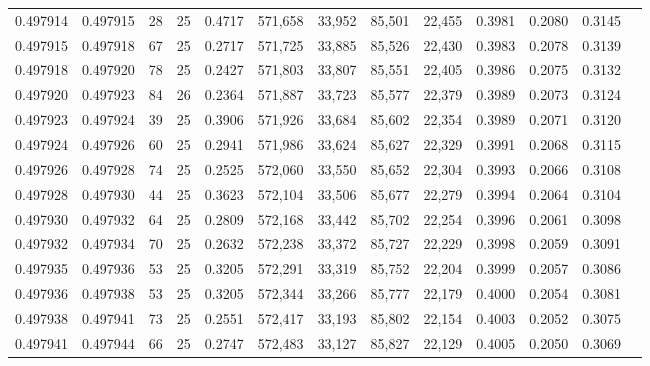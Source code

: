 \begin{tabular}{rrrrrrrrrrrrr}
0.497914 & 0.497915 &    28 &  25 &                                     0.4717 & 571,658 &  33,952 &  85,501 &  22,455 & 0.3981 & 0.2080 & 0.3145 \\
0.497915 & 0.497918 &    67 &  25 &                                     0.2717 & 571,725 &  33,885 &  85,526 &  22,430 & 0.3983 & 0.2078 & 0.3139 \\
0.497918 & 0.497920 &    78 &  25 &                                     0.2427 & 571,803 &  33,807 &  85,551 &  22,405 & 0.3986 & 0.2075 & 0.3132 \\
0.497920 & 0.497923 &    84 &  26 &                                     0.2364 & 571,887 &  33,723 &  85,577 &  22,379 & 0.3989 & 0.2073 & 0.3124 \\
0.497923 & 0.497924 &    39 &  25 &                                     0.3906 & 571,926 &  33,684 &  85,602 &  22,354 & 0.3989 & 0.2071 & 0.3120 \\
0.497924 & 0.497926 &    60 &  25 &                                     0.2941 & 571,986 &  33,624 &  85,627 &  22,329 & 0.3991 & 0.2068 & 0.3115 \\
0.497926 & 0.497928 &    74 &  25 &                                     0.2525 & 572,060 &  33,550 &  85,652 &  22,304 & 0.3993 & 0.2066 & 0.3108 \\
0.497928 & 0.497930 &    44 &  25 &                                     0.3623 & 572,104 &  33,506 &  85,677 &  22,279 & 0.3994 & 0.2064 & 0.3104 \\
0.497930 & 0.497932 &    64 &  25 &                                     0.2809 & 572,168 &  33,442 &  85,702 &  22,254 & 0.3996 & 0.2061 & 0.3098 \\
0.497932 & 0.497934 &    70 &  25 &                                     0.2632 & 572,238 &  33,372 &  85,727 &  22,229 & 0.3998 & 0.2059 & 0.3091 \\
0.497935 & 0.497936 &    53 &  25 &                                     0.3205 & 572,291 &  33,319 &  85,752 &  22,204 & 0.3999 & 0.2057 & 0.3086 \\
0.497936 & 0.497938 &    53 &  25 &                                     0.3205 & 572,344 &  33,266 &  85,777 &  22,179 & 0.4000 & 0.2054 & 0.3081 \\
0.497938 & 0.497941 &    73 &  25 &                                     0.2551 & 572,417 &  33,193 &  85,802 &  22,154 & 0.4003 & 0.2052 & 0.3075 \\
0.497941 & 0.497944 &    66 &  25 &                                     0.2747 & 572,483 &  33,127 &  85,827 &  22,129 & 0.4005 & 0.2050 & 0.3069 \\

\end{tabular}
